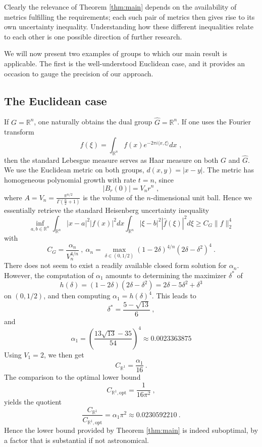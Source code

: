 \documentclass[12pt, reqno]{amsart}
\begin{document}
Clearly the relevance of Theorem \ref{thm:main} depends on the availability of metrics fulfilling the requirements; each such pair of metrics then gives rise to its own uncertainty inequality. Understanding how these different inequalities relate to each other is one possible direction of further research. 

We will now present two examples of groups to which our main result is applicable. The first is the well-understood Euclidean case, and it provides an occasion to gauge the precision of our approach. 

\subsection{The Euclidean case}

If $G = \mathbb{R}^n$, one naturally obtains the dual group $\widehat{G} = \mathbb{R}^n$. If one uses the Fourier transform
\[ \widehat{f}(\xi) = \int_{\mathbb{R}^n} f(x) e^{-2 \pi i \langle x, \xi \rangle} dx\, \,, \]
then the standard Lebesgue measure serves as Haar measure on both $G$ and $\widehat{G}$. We use the Euclidean metric on both groups, $d(x,y) = | x - y |$. The metric has homogeneous polynomial growth with rate $t=n$, since 
\[ |B_r(0)| = V_n r^n\,\,, \]
where $A = V_n = \frac{\pi^{n/2}}{\Gamma(\frac{n}{2}+1)}$ is the volume of the $n$-dimensional unit ball. Hence we essentially retrieve the standard Heisenberg uncertainty inequality
\[
\inf_{a,b \in \mathbb{R}^n}
\int_{\mathbb{R}^n} |x-a|^2 |f(x)|^2 dx \int_{\mathbb{R}^n}|\xi-b|^2 |\widehat{f}(\xi)|^2 d\xi \ge 
C_G \| f \|_2^4
\]
with
\[
C_G = \frac{\alpha_n}{V_n^{4/n}}~,~ \alpha_n = \max_{\delta \in (0,1/2)} (1-2 \delta)^{4/n} (2 \delta - \delta^2)^4~.
\]
There does not seem to exist a readily available closed form solution for $\alpha_n$. However, the computation of $\alpha_1$ amounts to determining the maximizer $\delta^*$ of 
\[
h(\delta) = (1-2\delta) (2 \delta - \delta^2) = 2\delta - 5 \delta^2 + \delta^3
\] on $(0,1/2)$, and then computing $\alpha_1 = h(\delta)^4$. This leads to 
\[
\delta^* = \frac{5-\sqrt{13}}{6}~,
\] and 
\[
\alpha_1 = \left( \frac{13\sqrt{13}-35}{54} \right)^4 \approx 0.0023363875
\] Using $V_1=2$, we then get
\[
C_{\mathbb{R}^1} = \frac{\alpha_1}{16}~.
\] The comparison to the optimal lower bound  
\[ C_{\mathbb{R}^1,\mathrm{opt}} = \frac{1}{16 \pi^2} ~,\] 
yields the quotient
\[
\frac{C_{\mathbb{R}^1}}{C_{\mathbb{R}^1,\mathrm{opt}}} = \alpha_1 \pi^2 \approx 0.0230592210~.
\] Hence the lower bound provided by Theorem \ref{thm:main} is indeed suboptimal, by a factor that is substantial if not astronomical.  
\end{document}
